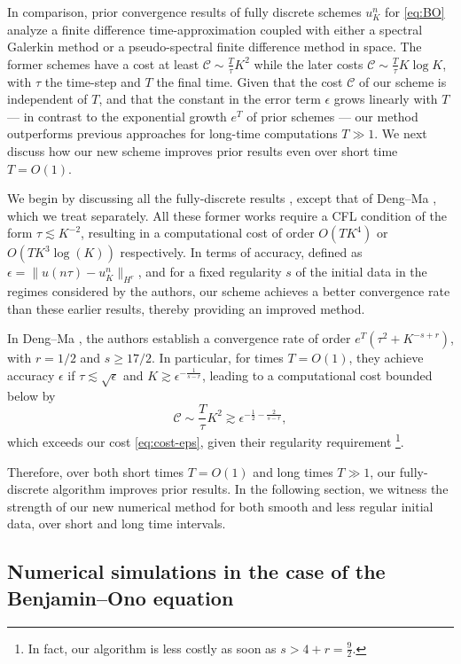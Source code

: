 \documentclass [11pt] {article}
\begin{document}
In comparison, prior convergence results of fully discrete schemes $u^{n}_{{K}}$ for \eqref{eq:BO} analyze a finite difference time-approximation coupled with either a spectral Galerkin method \cite{PD01, DM09, G16} or a pseudo-spectral finite difference method \cite{T98} in space. The former schemes have a cost at least  $\mathcal{C} \sim \frac{T}{\tau}K^2$ while the later costs $\mathcal{C} \sim \frac{T}{\tau}K\log K$, with $\tau$ the time-step and $T$ the final time.
Given that the cost $\mathcal{C}$ of our scheme is independent of $T$, and that the constant in the error term $\epsilon$ grows linearly with $T$ --- in contrast to the exponential growth $e^T$ of prior schemes --- our method outperforms previous approaches for long-time computations $T \gg 1$.
We next discuss how our new scheme improves prior results even over short time $T = O(1)$.

We begin by discussing all the fully-discrete results \cite{T98, PD01, G16}, except that of Deng--Ma \cite{DM09}, which we treat separately. All these former works require a CFL condition of the form $\tau \lesssim K^{-2}$, resulting in a computational cost of order $O(TK^4)$ or $O(TK^3\log(K))$ respectively. In terms of accuracy, defined as $\epsilon = \|u(n\tau) - u^{n}_{K}\|_{H^r}$, and for a fixed regularity $s$ of the initial data in the regimes considered by the authors, our scheme achieves a better convergence rate than these earlier results, thereby providing an improved method. 

In Deng--Ma \cite{DM09}, the authors establish a convergence rate of order $e^{T}(\tau^2 + K^{-s +r})$, with $r = 1/2$ and $s\ge 17/2$. In particular, for times $T = O(1)$, they achieve accuracy $\epsilon$ if $\tau\lesssim \sqrt\epsilon$ and $K\gtrsim \epsilon^{-\frac{1}{s-r}}$, leading to a computational cost bounded below by
\[
\mathcal{C} \sim \frac{T}{\tau}K^2\gtrsim \epsilon^{-\frac{1}{2}-\frac{2}{s-r}},
\]
which exceeds our cost \eqref{eq:cost-eps}, given their regularity requirement \footnote[4]{In fact, our algorithm is less costly as soon as $s >4+r=\frac92$.}. 

Therefore, over both short times $T= O(1)$ and long times $T\gg1$, our fully-discrete algorithm improves prior results. In the following section, we witness the strength of our new numerical method for both smooth and less regular initial data, over short and long time intervals.
\newline


\subsection{Numerical simulations in the case of the Benjamin–Ono equation}\label{sec:num}
\end{document}
